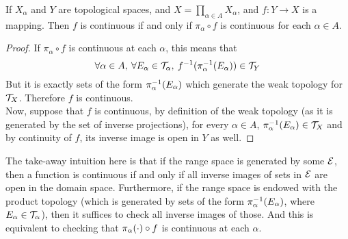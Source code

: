 \documentclass[../../main.tex]{subfiles}
\begin{document}
\begin{wts}
    If $X_\alpha$ and $Y$ are topological spaces, and $X = \prod_{\alpha\in A}X_\alpha$, and $f:Y\to X$ is a mapping. Then $f$ is continuous if and only if $\pi_\alpha\circ f$ is continuous for each $\alpha\in A$.
\end{wts}
\begin{proof}
    If $\pi_\alpha\circ f$ is continuous at each $\alpha$, this means that
    \[
    \forall \alpha\in A, \:\forall E_\alpha\in\mathcal{T}_\alpha,\: f^{-1}(\pi_{\alpha}^{-1}({E_\alpha}))\in \mathcal{T}_Y
    \]
    But it is exactly sets of the form $\pi_{\alpha}^{-1}({E_\alpha})$ which generate the weak topology for $\mathcal{T}_X$. Therefore $f$ is continuous.\\
    
    Now, suppose that $f$ is continuous, by definition of the weak topology (as it is generated by the set of inverse projections), for every $\alpha\in A$, $\pi_{\alpha}^{-1}({E_\alpha})\in \mathcal{T}_X$ and by continuity of $f$, its inverse image is open in $Y$ as well.
\end{proof}
\begin{remark}
    The take-away intuition here is that if the range space is generated by some $\mathcal{E}$, then a function is continuous if and only if all inverse images of sets in $\mathcal{E}$ are open in the domain space. Furthermore, if the range space is endowed with the product topology (which is generated by sets of the form $\pi_{\alpha}^{-1}({E_\alpha})$, where $E_\alpha\in \mathcal{T}_\alpha$), then it suffices to check all inverse images of those. And this is equivalent to checking that $\pi_{\alpha}({\cdot})\circ f$ is continuous at each $\alpha$.
\end{remark} 
\end{document}
